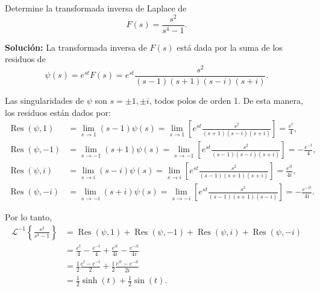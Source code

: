 \begin{ejemplo}
    Determine la transformada inversa de Laplace de 
    $$F(s) = \frac{s^2}{s^4-1}.$$

    \textbf{Solución:} La transformada inversa de $F(s)$ está dada por la suma de los residuos de
    $$\psi(s) = e^{st} F(s) = e^{st} \frac{s^2}{(s-1)(s+1)(s-i)(s+i)}.$$

    Las singularidades de $\psi$ son $s = \pm 1, \pm i$, todos polos de orden 1. De esta manera, los residuos están dados por:
    \begin{align*}
        \operatorname{Res}(\psi, 1) &= \lim_{s \to 1} (s-1) \psi(s) = \lim_{s\to 1} \left[e^{st} \frac{s^2}{(s+1)(s-i)(s+i)} \right] = \frac{e^t}{4},\\
        \operatorname{Res}(\psi, -1) &= \lim_{s \to -1} (s+1) \psi(s) = \lim_{s\to -1} \left[e^{st} \frac{s^2}{(s-1)(s-i)(s+i)} \right] = -\frac{e^{-t}}{4}, \\
        \operatorname{Res}(\psi, i) &= \lim_{s \to i} (s-i) \psi(s) = \lim_{s\to i} \left[e^{st} \frac{s^2}{(s-1)(s+1)(s+i)} \right] = \frac{e^{it}}{4i}, \\
        \operatorname{Res}(\psi, -i) &= \lim_{s \to -i} (s+i) \psi(s) = \lim_{s\to -i} \left[e^{st} \frac{s^2}{(s-1)(s+1)(s-i)} \right] = -\frac{e^{-it}}{4i}.
    \end{align*}

    Por lo tanto,
    \begin{align*}
        \mathcal{L}^{-1} \left\{\frac{s^2}{s^4-1} \right\} &= \operatorname{Res}(\psi,1) + \operatorname{Res}(\psi,-1) + \operatorname{Res}(\psi,i) + \operatorname{Res}(\psi, -i) \\
        &= \frac{e^t}{4} - \frac{e^{-t}}{4} + \frac{e^{it}}{4i} - \frac{e^{-it}}{4i} \\
        &= \frac{1}{2} \frac{e^t - e^{-t}}{2} + \frac{1}{2} \frac{e^{it} - e^{-it}}{2i} \\
        &= \frac{1}{2} \sinh(t) + \frac{1}{2} \sin(t).
    \end{align*}
\end{ejemplo}




